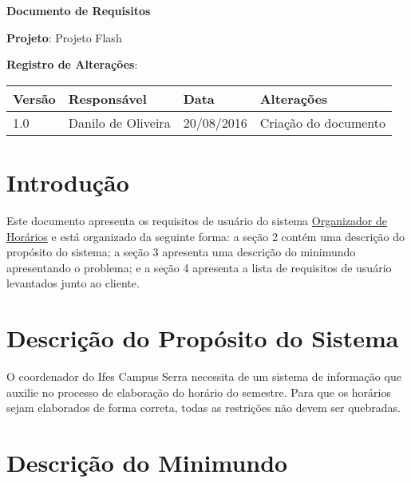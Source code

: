 \documentclass[a4paper, 12pt]{article}
\newcommand{\setfont}[2]{\fontsize{#1}{#2} \selectfont}
\begin{document}
	\begin{center}
		\textbf{\setfont{16}{19} Documento de Requisitos}
	\end{center}

	\vspace{24pt}

	\noindent \textbf{Projeto}: Projeto Flash

	\vspace{12pt}

	\noindent \textbf{Registro de Alterações}:



	\begin{table}[htp]
		\begin{center}
			\begin{tabular}{|p{1.3cm}|p{4cm}|p{2.3cm}|p{7.7cm}|}
				\hline
				\textbf{Versão} & \textbf{Responsável} & \textbf{Data} & \textbf{Alterações} \\
				\hline
				1.0 & Danilo de Oliveira & 20/08/2016 & Criação do documento \\
				\hline
			\end{tabular}
		\end{center}
	\end{table}
	
	
	\section{Introdução}
	
	Este documento apresenta os requisitos de usuário do sistema \uline{Organizador de Horários} e está organizado da seguinte forma: a seção 2 contém uma descrição do propósito do sistema; a seção 3 apresenta uma descrição do minimundo apresentando o problema; e a seção 4 apresenta a lista de requisitos de usuário levantados junto ao cliente.
	
	
	\section{Descrição do Propósito do Sistema}
	
	O coordenador do Ifes Campus Serra necessita de um sistema de informação que auxilie no processo de elaboração do horário do semestre. Para que os horários sejam elaborados de forma correta, todas as restrições não devem ser quebradas.
	
	\section{Descrição do Minimundo}
	
\end{document}
